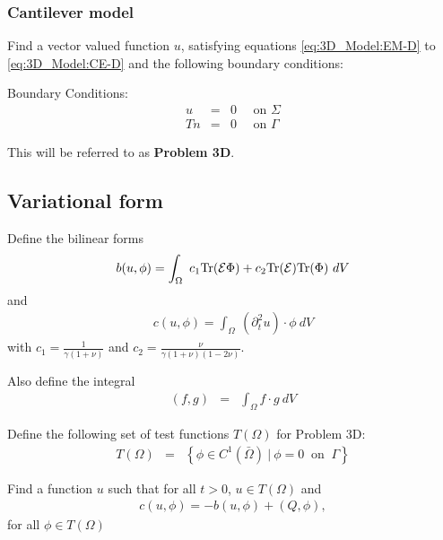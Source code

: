 		\subsubsection*{Cantilever model}
			Find a vector valued function $u$, satisfying equations
			\eqref{eq:3D_Model:EM-D} to \eqref{eq:3D_Model:CE-D} and the following boundary
			conditions:

			Boundary Conditions:
			\begin{eqnarray*}
				u & = & 0 \quad \textrm{ on } \Sigma\\
				Tn & = & 0 \quad \textrm{ on } \Gamma
			\end{eqnarray*}

			This will be referred to as \textbf{Problem 3D}.
			
		\subsection*{Variational form}\label{ssec:3D_Model:VariationalForm}
			Define the bilinear forms
			\begin{eqnarray}
				b(u,\phi) = \int_\Omega~c_1\textrm{Tr}({\cal E}\Phi)+ c_2\textrm{Tr}({\cal E})
				\textrm{Tr}(\Phi) ~dV \label{eq:3D_Model:Bilinear}
			\end{eqnarray}\label{sym:b}
			and
			\begin{eqnarray}
				c(u,\phi) = \int_\Omega~ (\partial^2_t u) \cdot \phi~dV \label{eq:3D_Model:Bilinear_c}
			\end{eqnarray}
			with $\displaystyle c_1 = \frac{1}{\gamma(1+\nu)}$ and $\displaystyle c_2 = \frac{\nu}{\gamma(1+\nu)(1-2\nu)}$.

			Also define the integral
			\begin{eqnarray}
				(f,g) &=& \int_{\Omega} f\cdot g \ dV \label{eq:3D_Model:Bilinear_int}
			\end{eqnarray}

			Define the following set of test functions $T(\Omega)$ for Problem 3D:
			\begin{eqnarray*}
				T(\Omega) & = & \left\{ \phi \in C^1(\bar{\Omega}) \ | \ \phi = 0 \ \textrm{ on } \ \Gamma \right\}
			\end{eqnarray*}\label{sym:TOmega}

			Find a function $u$ such that for all $t>0$, $u \in T(\Omega)$ and
			\begin{align}
				c(u,\phi) = -b(u,\phi) + (Q,\phi), \label{eq:3D_Model:Problem3D1VEq}
			\end{align}
			for all $\phi \in T(\Omega)$

